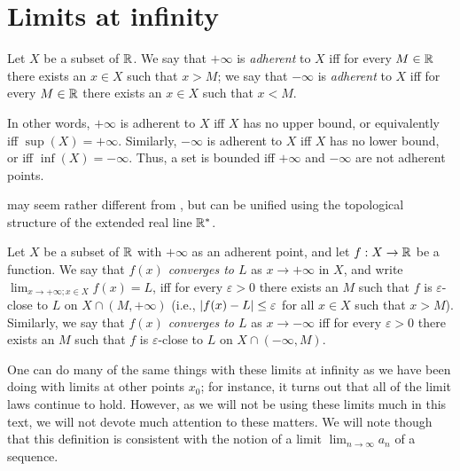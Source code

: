 \section{Limits at infinity}\label{i:sec:9.10}

\begin{defn}\label{i:9.10.1}
  Let \(X\) be a subset of \(\mathbb{R}\).
  We say that \(+\infty\) is \emph{adherent} to \(X\) iff for every \(M \in \mathbb{R}\) there exists an \(x \in X\) such that \(x > M\);
  we say that \(-\infty\) is \emph{adherent} to \(X\) iff for every \(M \in \mathbb{R}\) there exists an \(x \in X\) such that \(x < M\).
\end{defn}

\begin{note}
  In other words, \(+\infty\) is adherent to \(X\) iff \(X\) has no upper bound, or equivalently iff \(\sup(X) = +\infty\).
  Similarly, \(-\infty\) is adherent to \(X\) iff \(X\) has no lower bound, or iff \(\inf(X) = -\infty\).
  Thus, a set is bounded iff \(+\infty\) and \(-\infty\) are not adherent points.
\end{note}

\begin{rmk}\label{i:9.10.2}
   may seem rather different from , but can be unified using the topological structure of the extended real line \(\mathbb{R}^*\).
\end{rmk}

\begin{defn}\label{i:9.10.3}
  Let \(X\) be a subset of \(\mathbb{R}\) with \(+\infty\) as an adherent point, and let \(f : X \to \mathbb{R}\) be a function.
  We say that \emph{\(f(x)\) converges to \(L\)} as \(x \to +\infty\) in \(X\), and write \(\lim_{x \to +\infty ; x \in X} f(x) = L\), iff for every \(\varepsilon > 0\) there exists an \(M\) such that \(f\) is \(\varepsilon\)-close to \(L\) on \(X \cap (M, +\infty)\)
  (i.e., \(\left\lvert f(x) - L\right\rvert \leq \varepsilon\) for all \(x \in X\) such that \(x > M\)).
  Similarly, we say that \emph{\(f(x)\) converges to \(L\)} as \(x \to -\infty\) iff for every \(\varepsilon > 0\) there exists an \(M\) such that \(f\) is \(\varepsilon\)-close to \(L\) on \(X \cap (-\infty, M)\).
\end{defn}

\begin{note}
  One can do many of the same things with these limits at infinity as we have been doing with limits at other points \(x_0\);
  for instance, it turns out that all of the limit laws continue to hold.
  However, as we will not be using these limits much in this text, we will not devote much attention to these matters.
  We will note though that this definition is consistent with the notion of a limit \(\lim_{n \to \infty} a_n\) of a sequence.
\end{note}

